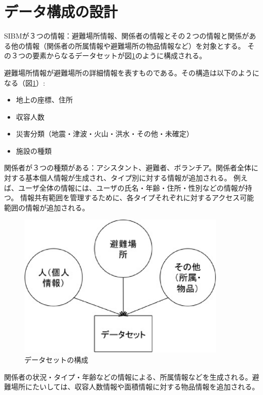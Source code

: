 \section{データ構成の設計}
\label{sibm:data_structure}

SIBMが３つの情報：避難場所情報、関係者の情報とその２つの情報と関係がある他の情報（関係者の所属情報や避難場所の物品情報など）を対象とする。
その３つの要素からなるデータセットが図\ref{fig:sibm_structrure}のように構成される。

避難場所情報が避難場所の詳細情報を表すものである。その構造は以下のようになる（図\ref{fig:sibm_structrure}）:

\begin{itemize}
  \item 地上の座標、住所
  \item 収容人数
  \item 災害分類（地震・津波・火山・洪水・その他・未確定）
  \item 施設の種類
\end{itemize}

関係者が３つの種類がある：アシスタント、避難者、ボランチア。関係者全体に対する基本個人情報が生成され、タイプ別に対する情報が追加される。
例えば、ユーザ全体の情報には、ユーザの氏名・年齢・住所・性別などの情報が持つ。
情報共有範囲を管理するために、各タイプそれぞれに対するアクセス可能範囲の情報が追加される。

\begin{figure}[h!]
 	\begin{center}
 		\includegraphics[width=100mm]{./images/sibm_construct.eps}
 		\caption{データセットの構成}
 		\label{fig:sibm_structrure}
 	\end{center}
\end{figure}

関係者の状況・タイプ・年齢などの情報による、所属情報などを生成される。避難場所にたいしては、収容人数情報や面積情報に対する物品情報を追加される。

